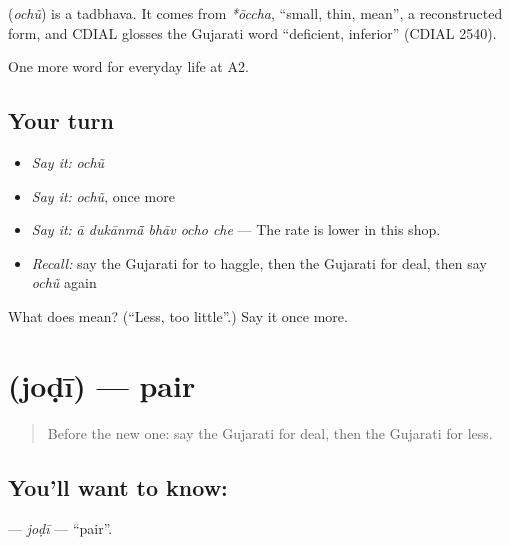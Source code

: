 \begin{cousinweb}
\textbf{} (\emph{ochũ}) is a tadbhava. It comes from \emph{*ōccha}, \textquotedblleft{}small, thin, mean\textquotedblright{}, a reconstructed form, and CDIAL glosses the Gujarati word \textquotedblleft{}deficient, inferior\textquotedblright{} (CDIAL 2540).
\end{cousinweb}

\begin{grammarlens}[title={What you've built}]
One more word for everyday life at A2.
\end{grammarlens}

\subsection*{Your turn}
\begin{itemize}
\raggedright
  \item \emph{Say it:} \emph{ochũ}
  \item \emph{Say it:} \emph{ochũ}, once more
  \item \emph{Say it:} \emph{ā dukānmā̃ bhāv ocho che} — The rate is lower in this shop.
  \item \emph{Recall:} say the Gujarati for to haggle, then the Gujarati for deal, then say \emph{ochũ} again
\end{itemize}

\begin{tcolorbox}[breakable,colback=teal!4,colframe=teal!35!black,title={Before you move on}]
What does  mean? (\textquotedblleft{}Less, too little\textquotedblright{}.) Say it once more.
\end{tcolorbox}
\section[\texorpdfstring{\gu{જોડી} (joḍī)}{જોડી (joḍī)}]{ (joḍī) — pair}

\label{lesson:GU-C185-jodi}



\begin{quote}
Before the new one: say the Gujarati for deal, then the Gujarati for less.
\end{quote}

\subsection*{You'll want to know: }
\textbf{} — \emph{joḍī} — \textquotedblleft{}pair\textquotedblright{}.

